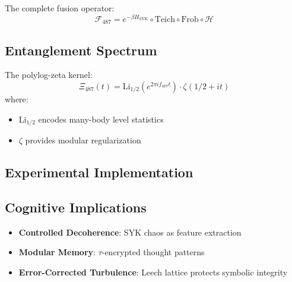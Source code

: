 \documentclass[12pt]{article}
\begin{document}
\noindent The complete fusion operator:
\[
\mathcal{F}_{487} = e^{-\beta H_{\text{SYK}}} \circ \text{Teich} \circ \text{Frob} \circ \mathcal{H}
\]

\subsection*{Entanglement Spectrum}
The polylog-zeta kernel:
\[
\Xi_{487}(t) = \text{Li}_{1/2}(e^{2\pi i f_{487} t}) \cdot \zeta(1/2 + it)
\]
where:
\begin{itemize}
    \item $\text{Li}_{1/2}$ encodes many-body level statistics
    \item $\zeta$ provides modular regularization
\end{itemize}

\subsection*{Experimental Implementation}
\begin{algorithm}[H]
\caption{Quantum Chaos Simulation}
\begin{algorithmic}[1]
\State \textbf{Input}: Time $t$, prime $p=487$, Majorana modes $\{\psi_i\}_{i=1}^N$
\State Sample couplings: $J_{ijkl} \sim \mathcal{N}(0, 3!/pN^3)$
\State Prepare state: $\ket{\psi(t)} = e^{-itH_{\text{SYK}}}} \ket{0}^{\otimes N}$
\State Measure OTOC:
\[
C(t) = \bra{\psi} \psi_i(t) \psi_j(0) \psi_i(t) \psi_j(0) \ket{\psi}
\]
\State \textbf{return} $\log C(t)/\log p$ \Comment{Lyapunov exponent}
\end{algorithmic}
\end{algorithm}

\subsection*{Cognitive Implications}
\begin{itemize}
    \item \textbf{Controlled Decoherence}: SYK chaos as feature extraction
    \item \textbf{Modular Memory}: $\tau$-encrypted thought patterns
    \item \textbf{Error-Corrected Turbulence}: Leech lattice protects symbolic integrity
\end{itemize}
\end{document}

